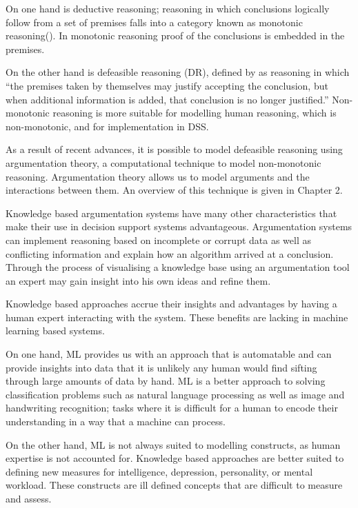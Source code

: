 On one hand is deductive reasoning; reasoning in which conclusions logically follow from a set of premises falls into a category known as monotonic reasoning(\cite{baroni1997full}). In monotonic reasoning proof of the conclusions is embedded in the premises.

On the other hand is defeasible reasoning (DR), defined by \cite{pollock1987defeasible} as reasoning in which ``the premises taken by themselves may justify accepting the conclusion, but when additional information is added, that conclusion is no longer justified.'' Non-monotonic reasoning is more suitable for modelling human reasoning, which is non-monotonic, and for implementation in DSS.

As a result of recent advances, it is possible to model defeasible reasoning using argumentation theory, a computational technique to model non-monotonic reasoning. Argumentation theory allows us to model arguments and the interactions between them. An overview of this technique is given in Chapter 2.

Knowledge based argumentation systems have many other characteristics that make their use in decision support systems advantageous. Argumentation systems can implement reasoning based on incomplete or corrupt data as well as conflicting information and explain how an algorithm arrived at a conclusion. Through the process of visualising a knowledge base using an argumentation tool an expert may gain insight into his own ideas and refine them. 

Knowledge based approaches accrue their insights and advantages by having a human expert interacting with the system. These benefits are lacking in machine learning based systems. 

On one hand, ML provides us with an approach that is automatable and can provide insights into data that it is unlikely any human would find sifting through large amounts of data by hand. ML is a better approach to solving classification problems such as natural language processing as well as image and handwriting recognition; tasks where it is difficult for a human to encode their understanding in a way that a machine can process.

On the other hand, ML is not always suited to modelling constructs, as human expertise is not accounted for. Knowledge based approaches are better suited to defining new measures for intelligence, depression, personality, or mental workload. These constructs are ill defined concepts that are difficult to measure and assess.

